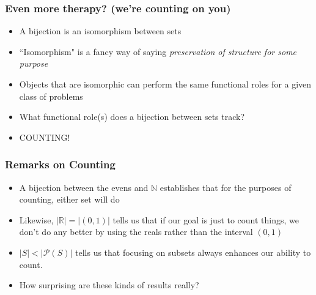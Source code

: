 \begin{frame}
\frametitle{Even more therapy? (we're counting on you)}

\begin{itemize}[<+->]

\item A bijection is an isomorphism between sets

\item ``Isomorphism" is a fancy way of saying \textit{preservation of structure for some purpose}

\item Objects that are isomorphic can perform the same functional roles for a given class of problems

\item What functional role(s) does a bijection between sets track?

\item COUNTING!

\end{itemize}
\end{frame}

\begin{frame}
\frametitle{Remarks on Counting}

\begin{itemize}[<+->]

\item A bijection between the evens and $\mathbb{N}$ establishes that for the purposes of counting, either set will do

\item Likewise, $|\mathbb{R}| = |(0, 1)|$ tells us that if our goal is just to count things, we don't do any better by using the reals rather than the interval $(0, 1)$

\item $|S| < |\mathscr{P}(S)|$ tells us that focusing on subsets always enhances our ability to count. 

\item How surprising are these kinds of results really?

\end{itemize}
\end{frame}

